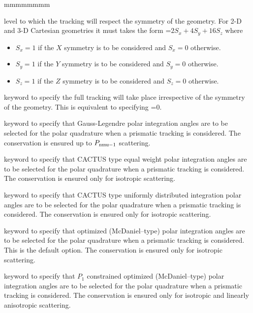 \begin{ListeDeDescription}{mmmmmmmm}
\item[\dusa{isymm}]  level to which the tracking will respect the symmetry of the geometry. For 2-D and 3-D Cartesian geometries it must takes the form =$2 S_{x}+4S_{y}+16 S_{z}$ where
\begin{itemize}
\item $S_{x}=1$ if the $X$ symmetry is to be considered and $S_{x}=0$ otherwise.   
\item $S_{y}=1$ if the $Y$ symmetry is to be considered and $S_{y}=0$ otherwise.   
\item $S_{z}=1$ if the $Z$ symmetry is to be considered and $S_{z}=0$ otherwise.   
\end{itemize}

\item[\moc{NOSY}] keyword to specify the full tracking will take place irrespective of the symmetry of the geometry. This is equivalent to specifying =0.

\item[\moc{GAUS}] keyword to specify that Gauss-Legendre polar integration angles are to be selected for the polar quadrature when a prismatic tracking is considered. The conservation is ensured up to $P_{\dusa{nmu}-1}$ scattering.

\item[\moc{CACA}] keyword to specify that CACTUS type equal weight polar integration angles are to be
selected for the polar quadrature when a prismatic tracking is considered.\cite{CACTUS} The conservation is ensured only for isotropic scattering.

\item[\moc{CACB}] keyword to specify that CACTUS type uniformly distributed integration polar angles
are to be selected for the polar quadrature when a prismatic tracking is considered.\cite{CACTUS} The conservation is ensured only for isotropic scattering.

\item[\moc{LCMD}] keyword to specify that optimized (McDaniel--type) polar integration angles are to be
selected for the polar quadrature when a prismatic tracking is considered.\cite{LCMD} This is the default option. The conservation is ensured only for isotropic scattering.

\item[\moc{OPP1}] keyword to specify that $P_1$ constrained optimized (McDaniel--type) polar integration angles are to be selected for the polar quadrature when a prismatic tracking is considered.\cite{LeTellierpa} The conservation is ensured only for isotropic and linearly anisotropic scattering.


\end{ListeDeDescription}

